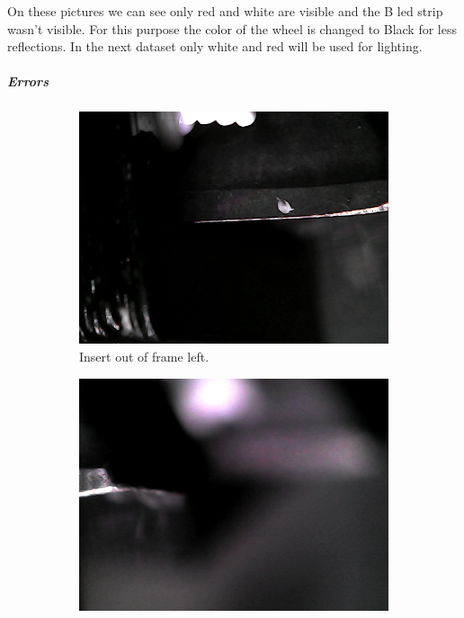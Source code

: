 On these pictures we can see only red and white are visible and the B led strip wasn't visible. For this purpose the color of the wheel is changed to Black for less reflections. In the next dataset only white and red will be used for lighting. 

\subparagraph{Errors}

\begin{figure}[hbtp]
	\begin{subfigure}{0.49\textwidth}
		\includegraphics[width=\linewidth, keepaspectratio=true]{./fig/Vision/Dataset/automated_datasets/2_created_datasets/1_Birthday_dataset/b_003_p_010_l_000_nb.png}
		\caption{Insert out of frame left.}
	\end{subfigure}
	\hspace*{\fill}
	\begin{subfigure}{0.49\textwidth}
		\includegraphics[width=\linewidth, keepaspectratio=true]{./fig/Vision/Dataset/automated_datasets/2_created_datasets/1_Birthday_dataset/b_003_p_010_l_000_b.png}

\end{subfigure}
\end{figure}
